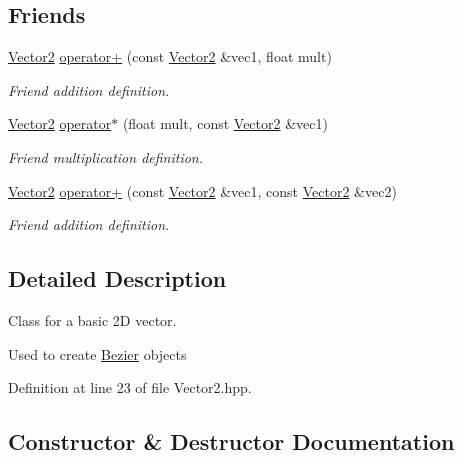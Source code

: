 \subsection*{Friends}
\begin{DoxyCompactItemize}
\item 
\mbox{\hyperlink{classVector2}{Vector2}} \mbox{\hyperlink{classVector2_a1ce2215611e761b7b1ca2f9f0dcdeb12}{operator+}} (const \mbox{\hyperlink{classVector2}{Vector2}} \&vec1, float mult)
\begin{DoxyCompactList}\small\item\em Friend addition definition. \end{DoxyCompactList}\item 
\mbox{\hyperlink{classVector2}{Vector2}} \mbox{\hyperlink{classVector2_abed1d1283eebca3cc8248543d219a937}{operator$\ast$}} (float mult, const \mbox{\hyperlink{classVector2}{Vector2}} \&vec1)
\begin{DoxyCompactList}\small\item\em Friend multiplication definition. \end{DoxyCompactList}\item 
\mbox{\hyperlink{classVector2}{Vector2}} \mbox{\hyperlink{classVector2_aec551a9b18e5851febf60c555fc382ab}{operator+}} (const \mbox{\hyperlink{classVector2}{Vector2}} \&vec1, const \mbox{\hyperlink{classVector2}{Vector2}} \&vec2)
\begin{DoxyCompactList}\small\item\em Friend addition definition. \end{DoxyCompactList}\end{DoxyCompactItemize}


\subsection{Detailed Description}
Class for a basic 2D vector. 

Used to create \mbox{\hyperlink{classBezier}{Bezier}} objects 

Definition at line 23 of file Vector2.\+hpp.



\subsection{Constructor \& Destructor Documentation}
\mbox{\label{classVector2_a061ab58a0e216c759d64e3746d712b12}} 

